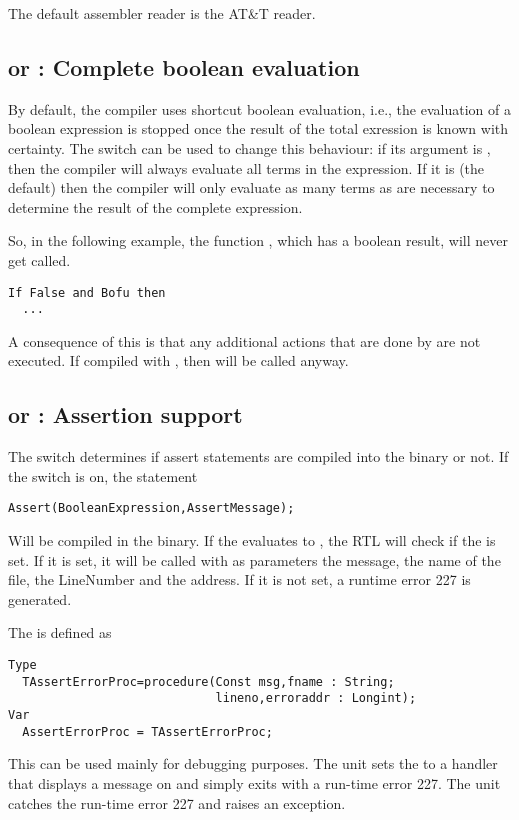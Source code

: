 The default assembler reader is the AT\&T reader.

\subsection{ or  : Complete boolean evaluation}

By default, the compiler uses shortcut boolean evaluation, i.e., the evaluation
of a boolean expression is stopped once the result of the total
exression is known with certainty. The  switch can be used
to change this behaviour: if its argument is , then the
compiler will always evaluate all terms in the expression. If it is
 (the default) then the compiler will only evaluate as many
terms as are necessary to determine the result of the complete expression.

So, in the following example, the function , which has a boolean
result, will never get called.
\begin{verbatim}
If False and Bofu then
  ...
\end{verbatim}
A consequence of this is that any additional actions that are done by
 are not executed. If compiled with , then
 will be called anyway.

\subsection{ or  : Assertion support}

The  switch determines if assert statements are
compiled into the binary or not. If the switch is on, the statement
\begin{verbatim}
Assert(BooleanExpression,AssertMessage);
\end{verbatim}
Will be compiled in the binary. If the  evaluates to
, the RTL will check if the  is set. If it
is set, it will be called with as parameters the 
message, the name of the file, the LineNumber and the address. If it is not
set, a runtime error 227 is generated.

The  is defined as
\begin{verbatim}
Type
  TAssertErrorProc=procedure(Const msg,fname : String;
                             lineno,erroraddr : Longint);
Var
  AssertErrorProc = TAssertErrorProc;
\end{verbatim}
This can be used mainly for debugging purposes. The  unit sets the
 to a handler that displays a message on 
and simply exits with a run-time error 227. The  unit catches the run-time error 227
and raises an  exception.

